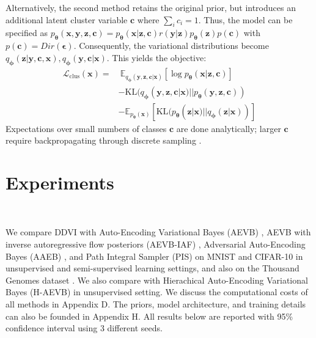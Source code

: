 \documentclass[letterpaper]{article} %
\newcommand{\bc}{\mathbf{c}}
\newcommand{\bx}{\mathbf{x}}
\newcommand{\bz}{\mathbf{z}}
\newcommand{\by}{\mathbf{y}}
\newcommand\Exp{\mathbb{E}}
\newcommand\KL{\text{KL}}
\newcommand\Lc{\mathcal{L}}
\newcommand{\bepsilon}{{\boldsymbol{\epsilon}}}
\let\oldtheta\theta
\renewcommand{\theta}{{\boldsymbol \oldtheta}}
\let\oldphi\phi
\renewcommand{\phi}{{\boldsymbol \oldphi}}
\let\oldepsilon\epsilon
\renewcommand{\epsilon}{{\boldsymbol \oldepsilon}}
\begin{document}
Alternatively, the second method retains the original prior, but introduces an additional latent cluster variable $\bc$ where $\sum_i c_i = 1$. Thus, the model can be specified as $p_\theta(\bx, \by, \bz, \bc) = p_\theta(\bx|\bz, \bc)r(\by|\bz)p_\theta(\bz)p(\bc)$ with $p(\bc) = Dir(\bepsilon)$. Consequently, the variational distributions become $q_\phi(\bz|\by, \bc, \bx), q_\phi(\by, \bc|\bx)$. This yields the objective:
\begin{align}
    \Lc_\text{clus} (\bx) =
    &~\Exp_{q_\phi(\by,\bz, \bc|\bx)} [\log p_\theta(\bx|\bz, \bc)] \\ \nonumber
     &- \KL(q_\phi(\by,\bz,\bc|\bx)||p_\theta(\by,\bz,\bc)) \\ \nonumber &- \Exp_{p_\theta(\bx)} \left [ \KL(p_\theta(\bz | \bx)||q_\phi(\bz|\bx)) \right ]
\end{align}
Expectations over small numbers of classes $\bc$ are done analytically; larger $\bc$ require backpropagating through discrete sampling \citep{jang2016categorical,sahoo2023backpropagation}.




\section{Experiments}~\label{sec:exp}

We compare DDVI with Auto-Encoding Variational Bayes (AEVB) \citep{kingma2013auto}, AEVB with inverse autoregressive flow posteriors (AEVB-IAF) \citep{kingma2016improved}, Adversarial Auto-Encoding Bayes (AAEB) \citep{makhzani2015adversarial}, and Path Integral Sampler (PIS) \cite{zhang2021path} on MNIST \citep{lecun1998mnist} and CIFAR-10 \citep{krizhevsky2009cifar} in unsupervised and semi-supervised learning settings, and also on the Thousand Genomes dataset \citep{siva20081000}. We also compare with Hierachical Auto-Encoding Variational Bayes (H-AEVB) \citep{ranganath2016hierarchical,vahdat2020nvae} in unsupervised setting. We discuss the computational costs of all methods in Appendix D. The priors, model architecture, and training details can also be founded in Appendix H. All results below are reported with 95\% confidence interval using 3 different seeds.
\end{document}
